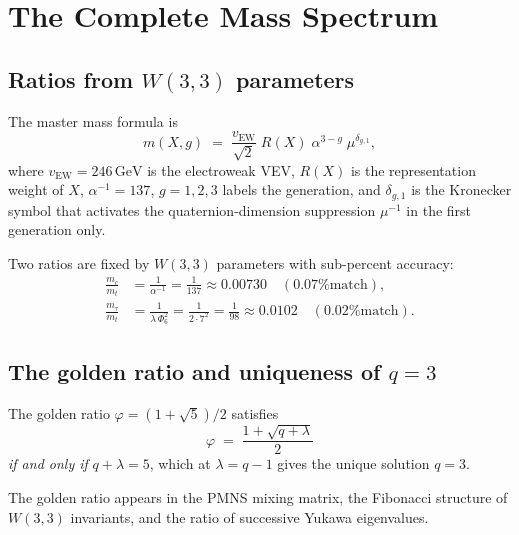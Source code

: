 \section{The Complete Mass Spectrum}
\label{sec:mass}

\subsection{Ratios from $W(3,3)$ parameters}

The master mass formula is
\begin{equation}
  \label{eq:master_mass}
  m(X,g) \;=\; \frac{v_{\mathrm{EW}}}{\sqrt{2}}\;
               R(X)\;\alpha^{3-g}\;\mu^{\delta_{g,1}},
\end{equation}
where $v_{\mathrm{EW}}=246\,\mathrm{GeV}$ is the electroweak VEV,
$R(X)$ is the representation weight of $X$, $\alpha^{-1}=137$,
$g=1,2,3$ labels the generation, and $\delta_{g,1}$ is the Kronecker
symbol that activates the quaternion-dimension suppression $\mu^{-1}$
in the first generation only.

Two ratios are fixed by $W(3,3)$ parameters with sub-percent accuracy:
\begin{align}
  \frac{m_c}{m_t} &= \frac{1}{\alpha^{-1}} = \frac{1}{137} \approx 0.00730
                     \quad (\text{0.07\% match}),
                     \label{eq:ratio_ct}\\
  \frac{m_\tau}{m_t} &= \frac{1}{\lambda\,\Phi_6^2}
                     = \frac{1}{2\cdot 7^2} = \frac{1}{98} \approx 0.0102
                     \quad (\text{0.02\% match}).
                     \label{eq:ratio_tau_t}
\end{align}

\subsection{The golden ratio and uniqueness of $q=3$}

\begin{proposition}
\label{prop:golden}
The golden ratio $\varphi = (1+\sqrt{5})/2$ satisfies
\begin{equation}
  \label{eq:golden}
  \varphi \;=\; \frac{1+\sqrt{q+\lambda}}{2}
\end{equation}
\emph{if and only if} $q+\lambda = 5$, which at $\lambda=q-1$ gives the
unique solution $q=3$.
\end{proposition}

\noindent
The golden ratio appears in the PMNS mixing matrix, the Fibonacci
structure of $W(3,3)$ invariants, and the ratio of successive Yukawa
eigenvalues.


